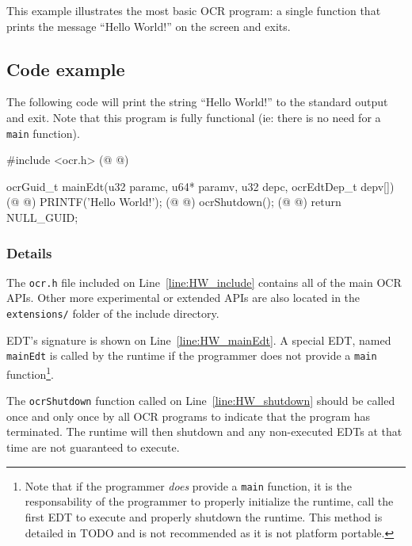 This example illustrates the most basic OCR program: a single function
that prints the message ``Hello World!'' on the screen and exits.
\subsection{Code example}
The following code will print the string ``Hello World!'' to the
standard output and exit. Note that this program is fully functional
(ie: there is no need for a \texttt{main} function).

\begin{ocrsnip}
#include <ocr.h> (@ \label{line:HW_include} @)

ocrGuid_t mainEdt(u32 paramc, u64* paramv, u32 depc, ocrEdtDep_t depv[]) { (@ \label{line:HW_mainEdt} @)
    PRINTF('Hello World!\n'); (@ \label{line:HW_printf}@)
    ocrShutdown(); (@ \label{line:HW_shutdown}@)
    return NULL_GUID;
}
\end{ocrsnip}
\subsubsection{Details}
The \texttt{ocr.h} file included on Line~\ref{line:HW_include}
contains all of the main OCR APIs. Other more experimental or extended
APIs are also located in the \texttt{extensions/} folder of the
include directory.

EDT's signature is shown on Line~\ref{line:HW_mainEdt}. A special EDT,
named \texttt{mainEdt} is called by the runtime if the programmer does not
provide a \texttt{main} function\footnote{Note that if the programmer
  \emph{does} provide a \texttt{main} function, it is the
  responsability of the programmer to properly initialize the runtime,
  call the first EDT to execute and properly shutdown the runtime. This
  method is detailed in TODO and is not recommended as it is not
  platform portable.}.

The \texttt{ocrShutdown} function called on
Line~\ref{line:HW_shutdown} should be called once and only once by all
OCR programs to indicate that the program has terminated. The runtime
will then shutdown and any non-executed EDTs at that time are not
guaranteed to execute.
